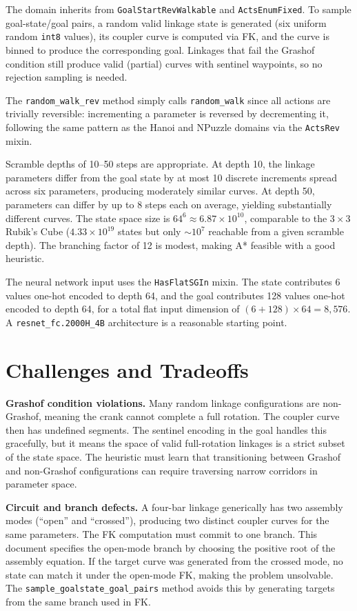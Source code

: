 \documentclass[11pt]{article}
\begin{document}
The domain inherits from \texttt{GoalStartRevWalkable} and \texttt{ActsEnumFixed}. To sample goal-state/goal pairs, a random valid linkage state is generated (six uniform random \texttt{int8} values), its coupler curve is computed via FK, and the curve is binned to produce the corresponding goal. Linkages that fail the Grashof condition still produce valid (partial) curves with sentinel waypoints, so no rejection sampling is needed.

The \texttt{random\_walk\_rev} method simply calls \texttt{random\_walk} since all actions are trivially reversible: incrementing a parameter is reversed by decrementing it, following the same pattern as the Hanoi and NPuzzle domains via the \texttt{ActsRev} mixin.

Scramble depths of 10--50 steps are appropriate. At depth 10, the linkage parameters differ from the goal state by at most 10 discrete increments spread across six parameters, producing moderately similar curves. At depth 50, parameters can differ by up to 8 steps each on average, yielding substantially different curves. The state space size is $64^6 \approx 6.87 \times 10^{10}$, comparable to the $3 \times 3$ Rubik's Cube ($4.33 \times 10^{19}$ states but only $\sim 10^7$ reachable from a given scramble depth). The branching factor of 12 is modest, making A* feasible with a good heuristic.

The neural network input uses the \texttt{HasFlatSGIn} mixin. The state contributes 6 values one-hot encoded to depth 64, and the goal contributes 128 values one-hot encoded to depth 64, for a total flat input dimension of $(6 + 128) \times 64 = 8{,}576$. A \texttt{resnet\_fc.2000H\_4B} architecture is a reasonable starting point.

\section{Challenges and Tradeoffs}

\textbf{Grashof condition violations.} Many random linkage configurations are non-Grashof, meaning the crank cannot complete a full rotation. The coupler curve then has undefined segments. The sentinel encoding in the goal handles this gracefully, but it means the space of valid full-rotation linkages is a strict subset of the state space. The heuristic must learn that transitioning between Grashof and non-Grashof configurations can require traversing narrow corridors in parameter space.

\textbf{Circuit and branch defects.} A four-bar linkage generically has two assembly modes (``open'' and ``crossed''), producing two distinct coupler curves for the same parameters. The FK computation must commit to one branch. This document specifies the open-mode branch by choosing the positive root of the assembly equation. If the target curve was generated from the crossed mode, no state can match it under the open-mode FK, making the problem unsolvable. The \texttt{sample\_goalstate\_goal\_pairs} method avoids this by generating targets from the same branch used in FK.
\end{document}
